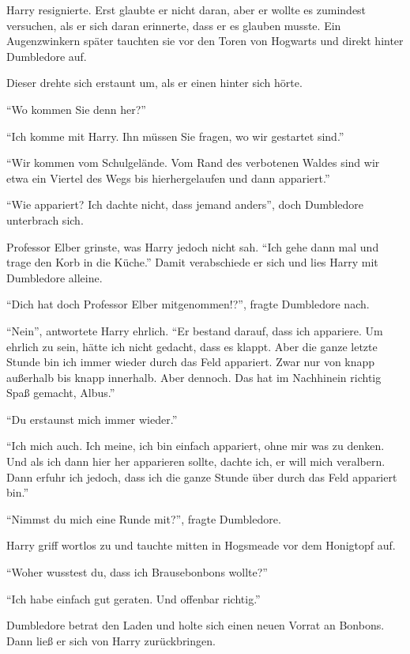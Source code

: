 Harry resignierte. Erst glaubte er nicht daran, aber er wollte es zumindest versuchen, als er sich daran erinnerte, dass er es glauben musste. Ein Augenzwinkern später tauchten sie vor den Toren von Hogwarts und direkt hinter Dumbledore auf.

Dieser drehte sich erstaunt um, als er einen  hinter sich hörte.

\enquote{Wo kommen Sie denn her?}

\enquote{Ich komme mit Harry. Ihn müssen Sie fragen, wo wir gestartet sind.}

\enquote{Wir kommen vom Schulgelände. Vom Rand des verbotenen Waldes sind wir etwa ein Viertel des Wegs bis hierhergelaufen und dann appariert.}

\enquote{Wie appariert? Ich dachte nicht, dass jemand anders\abs}, doch Dumbledore unterbrach sich.

Professor Elber grinste, was Harry jedoch nicht sah. \enquote{Ich gehe dann mal und trage den Korb in die Küche.} Damit verabschiede er sich und lies Harry mit Dumbledore alleine.

\enquote{Dich hat doch Professor Elber mitgenommen!?}, fragte Dumbledore nach.

\enquote{Nein}, antwortete Harry ehrlich. \enquote{Er bestand darauf, dass ich appariere. Um ehrlich zu sein, hätte ich nicht gedacht, dass es klappt. Aber die ganze letzte Stunde bin ich immer wieder durch das Feld appariert. Zwar nur von knapp außerhalb bis knapp innerhalb. Aber dennoch. Das hat im Nachhinein richtig Spaß gemacht, Albus.}

\enquote{Du erstaunst mich immer wieder.}

\enquote{Ich mich auch. Ich meine, ich bin einfach appariert, ohne mir was zu denken. Und als ich dann hier her apparieren sollte, dachte ich, er will mich veralbern. Dann erfuhr ich jedoch, dass ich die ganze Stunde über durch das Feld appariert bin.}

\enquote{Nimmst du mich eine Runde mit?}, fragte Dumbledore.

Harry griff wortlos zu und tauchte mitten in Hogsmeade vor dem Honigtopf auf.

\enquote{Woher wusstest du, dass ich Brausebonbons wollte?}

\enquote{Ich habe einfach gut geraten. Und offenbar richtig.}

Dumbledore betrat den Laden und holte sich einen neuen Vorrat an Bonbons. Dann ließ er sich von Harry zurückbringen.

